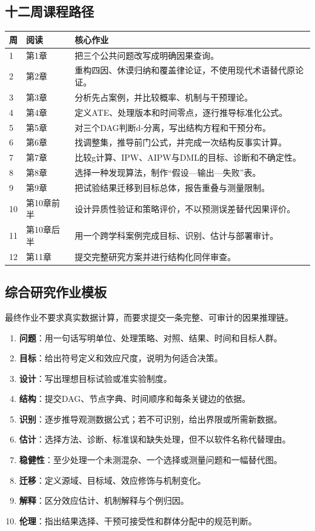 \subsection{十二周课程路径}

\begin{longtable}{p{}p{}p{}}
\toprule
周 & 阅读 & 核心作业\\
\midrule
1 & 第1章 & 把三个公共问题改写成明确因果查询。\\
2 & 第2章 & 重构四因、休谟归纳和覆盖律论证，不使用现代术语替代原论证。\\
3 & 第3章 & 分析先占案例，并比较概率、机制与干预理论。\\
4 & 第4章 & 定义ATE、处理版本和时间零点，逐行推导标准化公式。\\
5 & 第5章 & 对三个DAG判断d-分离，写出结构方程和干预分布。\\
6 & 第6章 & 找调整集，推导前门公式，并完成一次结构反事实计算。\\
7 & 第7章 & 比较g计算、IPW、AIPW与DML的目标、诊断和不确定性。\\
8 & 第8章 & 选择一种发现算法，制作“假设---输出---失败”表。\\
9 & 第9章 & 把试验结果迁移到目标总体，报告重叠与测量限制。\\
10 & 第10章前半 & 设计异质性验证和策略评价，不以预测误差替代因果评价。\\
11 & 第10章后半 & 用一个跨学科案例完成目标、识别、估计与部署审计。\\
12 & 第11章 & 提交完整研究方案并进行结构化同伴审查。\\
\bottomrule
\end{longtable}

\subsection{综合研究作业模板}

最终作业不要求真实数据计算，而要求提交一条完整、可审计的因果推理链。

\begin{enumerate}
  \item \textbf{问题}：用一句话写明单位、处理策略、对照、结果、时间和目标人群。
  \item \textbf{目标}：给出符号定义和效应尺度，说明为何适合决策。
  \item \textbf{设计}：写出理想目标试验或准实验制度。
  \item \textbf{结构}：提交DAG、节点字典、时间顺序和每条关键边的依据。
  \item \textbf{识别}：逐步推导观测数据公式；若不可识别，给出界限或所需新数据。
  \item \textbf{估计}：选择方法、诊断、标准误和缺失处理，但不以软件名称代替理由。
  \item \textbf{稳健性}：至少处理一个未测混杂、一个选择或测量问题和一幅替代图。
  \item \textbf{迁移}：定义源域、目标域、效应修饰与机制变化。
  \item \textbf{解释}：区分效应估计、机制解释与个例归因。
  \item \textbf{伦理}：指出结果选择、干预可接受性和群体分配中的规范判断。
\end{enumerate}

